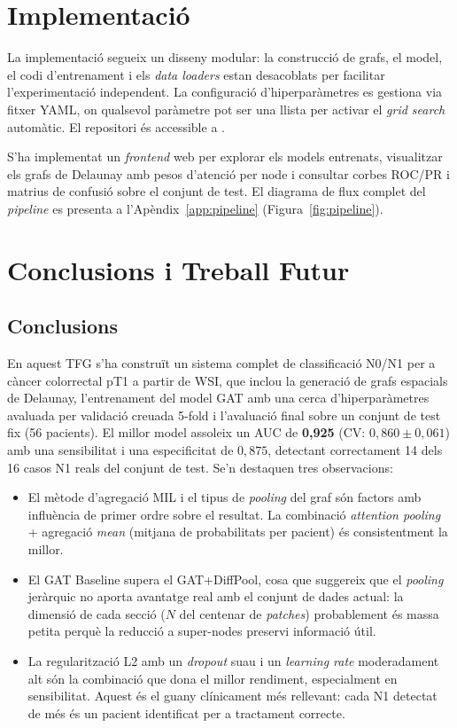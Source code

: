 \documentclass[10pt,a4paper,twocolumn,twoside]{article}
\begin{document}
\section{Implementació}

La implementació segueix un disseny modular: la construcció de grafs, el model, el codi d'entrenament i els
\textit{data loaders} estan desacoblats per facilitar l'experimentació independent. La configuració
d'hiperparàmetres es gestiona via fitxer YAML, on qualsevol paràmetre pot ser una llista per activar el
\textit{grid search} automàtic. El repositori és accessible a \cite{morillo2026codi}.

S'ha implementat un \textit{frontend} web per explorar els models entrenats,
visualitzar els grafs de Delaunay amb pesos d'atenció per node i consultar corbes ROC/PR i matrius de
confusió sobre el conjunt de test. El diagrama de flux complet del \textit{pipeline} es presenta a
l'Apèndix~\ref{app:pipeline} (Figura~\ref{fig:pipeline}).

\section{Conclusions i Treball Futur}

\subsection{Conclusions}

En aquest TFG s'ha construït un sistema complet de classificació N0/N1 per a càncer
colorrectal pT1 a partir de WSI, que inclou la generació de grafs espacials de Delaunay,
l'entrenament del model GAT amb una cerca d'hiperparàmetres avaluada per validació creuada
5-fold i l'avaluació final sobre un conjunt de test fix (56 pacients). El millor model
assoleix un AUC de \textbf{0,925} (CV: $0{,}860 \pm 0{,}061$) amb una sensibilitat i una
especificitat de $0{,}875$, detectant correctament 14 dels 16 casos N1 reals del conjunt de
test. Se'n destaquen tres observacions:

\begin{itemize}
  \item El mètode d'agregació MIL i el tipus de \textit{pooling} del graf són factors amb
  influència de primer ordre sobre el resultat. La combinació \textit{attention pooling} +
  agregació \textit{mean} (mitjana de probabilitats per pacient) és consistentment la millor.
  \item El GAT Baseline supera el GAT+DiffPool, cosa que suggereix que el \textit{pooling}
  jeràrquic no aporta avantatge real amb el conjunt de dades actual: la dimensió de cada
  secció ($N$ del centenar de \textit{patches}) probablement és massa petita perquè
  la reducció a super-nodes preservi informació útil.
  \item La regularització L2 amb un \textit{dropout} suau i un \textit{learning rate}
  moderadament alt són la combinació que dona el millor rendiment, especialment en
  sensibilitat. Aquest és el guany clínicament més rellevant: cada N1 detectat de més
  és un pacient identificat per a tractament correcte.
\end{itemize}
\end{document}
